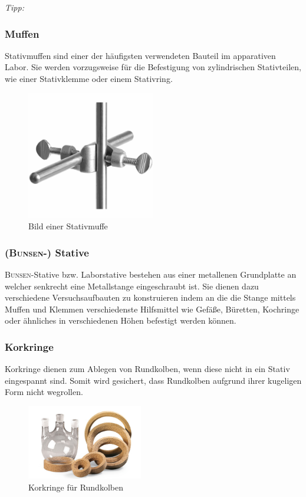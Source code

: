 \textit{Tipp:}\\
\vspace*{-5mm}


\subsubsection{Muffen}
Stativmuffen sind einer der häufigsten verwendeten Bauteil im apparativen Labor. Sie werden vorzugsweise für die Befestigung von zylindrischen Stativteilen, wie einer Stativklemme oder einem Stativring.
\begin{figure}[h!]
	\centering
	\includegraphics[width=0.5\textwidth]{img/muffe}
	\caption{Bild einer Stativmuffe}
	\label{fig:muffe}
\end{figure}
\FloatBarrier

\subsubsection{(\textsc{Bunsen}-) Stative}
\textsc{Bunsen}-Stative bzw. Laborstative bestehen aus einer metallenen Grundplatte an welcher senkrecht eine Metallstange eingeschraubt ist. Sie dienen dazu verschiedene Versuchsaufbauten zu konstruieren indem an die die Stange mittels Muffen und Klemmen verschiedenste Hilfsmittel wie Gefäße, Büretten, Kochringe oder ähnliches in verschiedenen Höhen befestigt werden können.

\subsubsection{Korkringe}
Korkringe dienen zum Ablegen von Rundkolben, wenn diese nicht in ein Stativ eingespannt sind. Somit wird gesichert, dass Rundkolben aufgrund ihrer kugeligen Form nicht wegrollen.
\begin{figure}[h!]
	\centering
	\includegraphics[width=0.45\textwidth]{img/korkring}
	\caption{Korkringe für Rundkolben}
	\label{fig:korkring}
\end{figure}
\FloatBarrier

